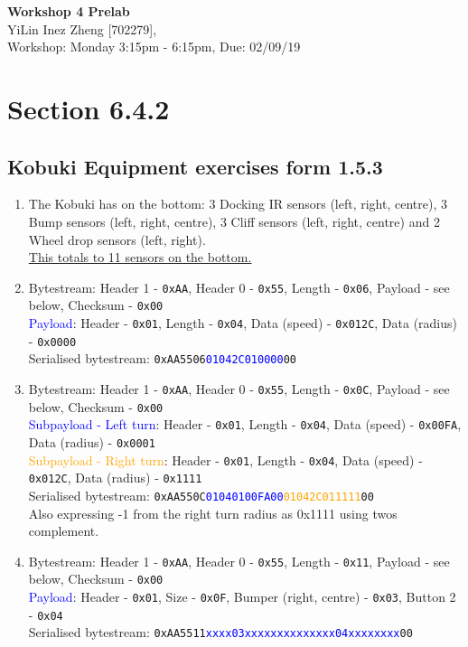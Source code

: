 \documentclass[11pt]{article}
\begin{document}
\begin{center}
\textbf{\Large{Workshop 4 Prelab}}\\
YiLin Inez Zheng [702279], \\
Workshop: Monday 3:15pm - 6:15pm, Due: 02/09/19  
\end{center}

\section{Section 6.4.2}
\subsection{Kobuki Equipment exercises form 1.5.3}
\begin{enumerate}
    \item %
    The Kobuki has on the bottom: 3 Docking IR sensors (left, right, centre), 3 Bump sensors (left, right, centre), 3 Cliff sensors (left, right, centre) and 2 Wheel drop sensors (left, right).\\ 
    \underline{This totals to 11 sensors on the bottom.}
    \item %
    Bytestream: Header 1 - \texttt{0xAA}, Header 0 - \texttt{0x55}, Length - \texttt{0x06}, Payload - see below, Checksum - \texttt{0x00}\\
    \textcolor{blue}{Payload}: Header - \texttt{0x01}, Length - \texttt{0x04}, Data (speed) - \texttt{0x012C}, Data (radius) - \texttt{0x0000}\\
    Serialised bytestream: \texttt{0xAA5506\textcolor{blue}{01042C010000}00}
    \item %
    Bytestream: Header 1 - \texttt{0xAA}, Header 0 - \texttt{0x55}, Length - \texttt{0x0C}, Payload - see below, Checksum - \texttt{0x00}\\
    \textcolor{blue}{Subpayload - Left turn}: Header - \texttt{0x01}, Length - \texttt{0x04}, Data (speed) - \texttt{0x00FA}, Data (radius) - \texttt{0x0001}\\
    \textcolor{orange}{Subpayload - Right turn}: Header - \texttt{0x01}, Length - \texttt{0x04}, Data (speed) - \texttt{0x012C}, Data (radius) - \texttt{0x1111}\\
    Serialised bytestream: \texttt{0xAA550C\textcolor{blue}{01040100FA00}\textcolor{orange}{01042C011111}00}\\
    Also expressing -1 from the right turn radius as 0x1111 using twos complement.
    \item %
    Bytestream: Header 1 - \texttt{0xAA}, Header 0 - \texttt{0x55}, Length - \texttt{0x11}, Payload - see below, Checksum - \texttt{0x00}\\
    \textcolor{blue}{Payload}: Header - \texttt{0x01}, Size - \texttt{0x0F}, Bumper (right, centre) - \texttt{0x03}, Button 2 - \texttt{0x04}\\
    Serialised bytestream: \texttt{0xAA5511\textcolor{blue}{xxxx03xxxxxxxxxxxxxx04xxxxxxxx}00}
\end{enumerate}
\end{document}
